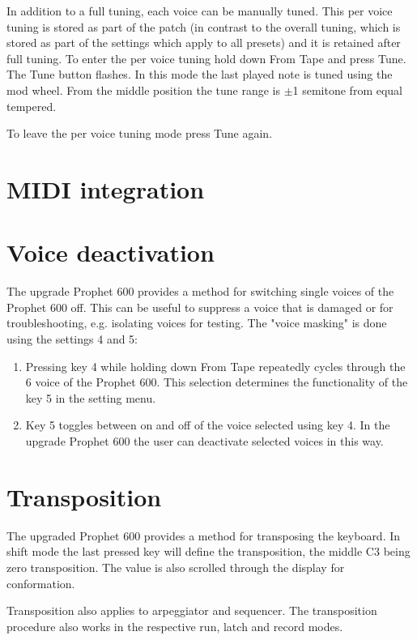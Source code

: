 \documentclass[draft,landscape, 11pt, oneside]{report}
\newenvironment{flowtext}{\addmargin[0cm]{7cm}}{\endaddmargin} %
\begin{document}
\begin{flowtext}
In addition to a full tuning, each voice can be manually tuned. This per voice tuning is stored as part of the patch (in contrast to the overall tuning, which is stored as part of the settings which apply to all presets) and it is retained after full tuning. To enter the per voice tuning hold down From Tape and press Tune. The Tune button flashes. In this mode the last played note is tuned using the mod wheel. From the middle position the tune range is $\pm$1 semitone from equal tempered.

To leave the per voice tuning mode press Tune again.

\section{MIDI integration}\label{midiintegration}



\section{Voice deactivation}

The upgrade Prophet 600 provides a method for switching single voices of the Prophet 600 off. This can be useful to suppress a voice that is damaged or for troubleshooting, e.g. isolating voices for testing. The "voice masking" is done using the settings 4 and 5:
\begin{enumerate}
  \setlength\itemsep{0cm}
  \item Pressing key 4 while holding down From Tape repeatedly cycles through the 6 voice of the Prophet 600. This selection determines the functionality of the key 5 in the setting menu.
  \item Key 5 toggles between on and off of the voice selected using key 4. In the upgrade Prophet 600 the user can deactivate selected voices in this way.
\end{enumerate}

\section{Transposition}

The upgraded Prophet 600 provides a method for transposing the keyboard. In shift mode the last pressed key will define the transposition, the middle C3 being zero transposition. The value is also scrolled through the display for conformation. 

Transposition also applies to arpeggiator and sequencer. The transposition procedure also works in the respective run, latch and record modes.


\end{flowtext}
\end{document}
